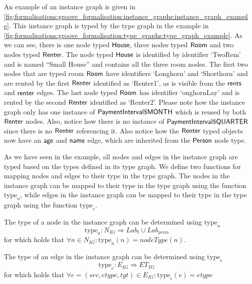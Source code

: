 An example of an instance graph is given in \cref{fig:formalisations:groove_formalisation:instance_graphs:instance_graph_example}. This instance graph is typed by the type graph in the example in \cref{fig:formalisations:groove_formalisation:type_graphs:type_graph_example}. As we can see, there is one node typed $\mathsf{House}$, three nodes typed $\mathsf{Room}$ and two nodes typed $\mathsf{Renter}$. The node typed $\mathsf{House}$ is identified by identifier `TwoRem' and is named ``Small House'' and contains all the three room nodes. The first two nodes that are typed room $\mathsf{Room}$ have identifiers `Longhorn' and `Shorthorn' and are rented by the first $\mathsf{Renter}$ identified as `Renter1', as is visible from the $\mathsf{rents}$ and $\mathsf{renter}$ edges. The last node typed $\mathsf{Room}$ has identifier `onghornLay' and is rented by the second $\mathsf{Renter}$ identified as `Renter2'. Please note how the instance graph only has one instance of $\mathsf{PaymentInterval\$MONTH}$ which is reused by both $\mathsf{Renter}$ nodes. Also, notice how there is no instance of $\mathsf{PaymentInterval\$QUARTER}$ since there is no $\mathsf{Renter}$ referencing it. Also notice how the $\mathsf{Renter}$ typed objects now have an $\mathsf{age}$ and $\mathsf{name}$ edge, which are inherited from the $\mathsf{Person}$ node type.

As we have seen in the example, all nodes and edges in the instance graph are typed based on the types defined in its type graph. We define two functions for mapping nodes and edges to their type in the type graph. The nodes in the instance graph can be mapped to their type in the type graph using the function $\mathrm{type}_n$, while edges in the instance graph can be mapped to their type in the type graph using the function $\mathrm{type}_e$.

\begin{defin}[Types]
\label{defin:formalisations:groove_formalisation:instance_graphs:types}
The type of a node in the instance graph can be determined using $\mathrm{type}_n$
\begin{equation*}
    \mathrm{type}_n: N_{IG} \Rightarrow Lab_t \cup Lab_{prim}
\end{equation*}
for which holds that $\forall n \in N_{IG}: \mathrm{type}_n(n) = nodeType(n)$.

The type of an edge in the instance graph can be determined using $\mathrm{type}_e$
\begin{equation*}
    \mathrm{type}_e: E_{IG} \Rightarrow ET_{TG}
\end{equation*}
for which holds that $\forall e = (src, etype, tgt) \in E_{IG}: \mathrm{type}_e(e) = etype$
\end{defin}

